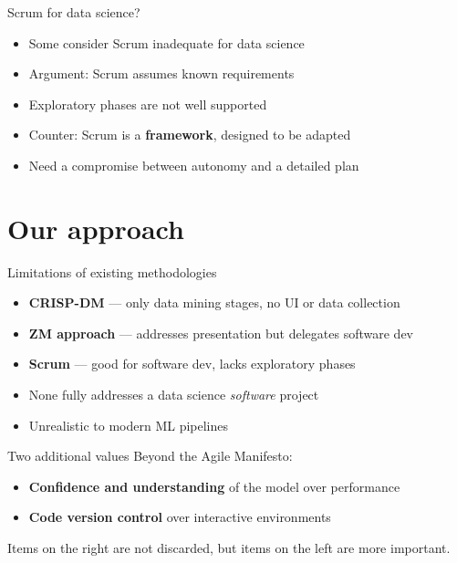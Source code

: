\begin{frame}{Scrum for data science?}
  \begin{itemize}
    \item Some consider Scrum inadequate for data science
    \item Argument: Scrum assumes known requirements
    \item Exploratory phases are not well supported
    \item Counter: Scrum is a \textbf{framework}, designed to be adapted
    \item Need a compromise between autonomy and a detailed plan
  \end{itemize}
\end{frame}

\section{Our approach}

\begin{frame}{Limitations of existing methodologies}
  \begin{itemize}
    \item \textbf{CRISP-DM} --- only data mining stages, no UI or data collection
    \item \textbf{ZM approach} --- addresses presentation but delegates software dev
    \item \textbf{Scrum} --- good for software dev, lacks exploratory phases
    \item None fully addresses a data science \textit{software} project
    \item Unrealistic to modern ML pipelines
  \end{itemize}
\end{frame}

\begin{frame}{Two additional values}
  Beyond the Agile Manifesto:

  \vspace{0.5cm}
  \begin{itemize}
    \item \textbf{Confidence and understanding} of the model over performance
    \item \textbf{Code version control} over interactive environments
  \end{itemize}

  \vspace{0.5cm}
  Items on the right are not discarded, but items on the left are more important.
\end{frame}

